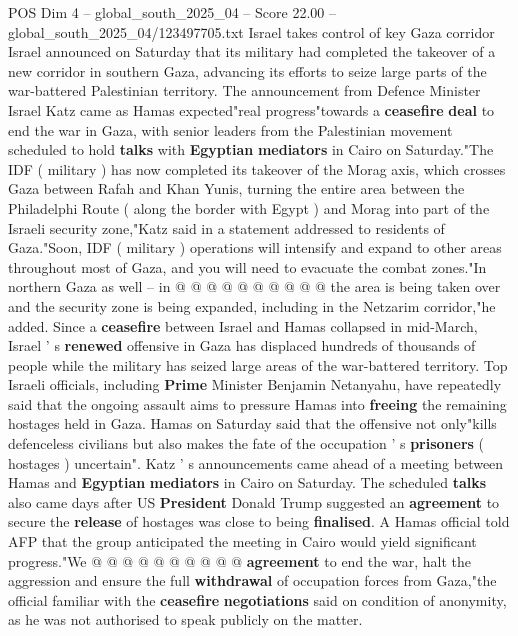 \begin{textsample}{POS Dim 4 – global\_south\_2025\_04 – Score 22.00 – global\_south\_2025\_04/123497705.txt}  \label{ex:f4_pos_223}
Israel takes control of key Gaza corridor Israel announced on Saturday that its military had completed the takeover of a new corridor in southern Gaza, advancing its efforts to seize large parts of the war-battered Palestinian territory.
The announcement from Defence Minister Israel Katz came as Hamas expected"real progress"towards a \textbf{ceasefire} \textbf{deal} to end the war in Gaza, with senior leaders from the Palestinian movement scheduled to hold \textbf{talks} with \textbf{Egyptian} \textbf{mediators} in Cairo on Saturday."The IDF ( military ) has now completed its takeover of the Morag axis, which crosses Gaza between Rafah and Khan Yunis, turning the entire area between the Philadelphi Route ( along the border with Egypt ) and Morag into part of the Israeli security zone,"Katz said in a statement addressed to residents of Gaza."Soon, IDF ( military ) operations will intensify and expand to other areas throughout most of Gaza, and you will need to evacuate the combat zones."In northern Gaza as well -- in @ @ @ @ @ @ @ @ @ @ the area is being taken over and the security zone is being expanded, including in the Netzarim corridor,"he added.
Since a \textbf{ceasefire} between Israel and Hamas collapsed in mid-March, Israel ' s \textbf{renewed} offensive in Gaza has displaced hundreds of thousands of people while the military has seized large areas of the war-battered territory.
Top Israeli officials, including \textbf{Prime} Minister Benjamin Netanyahu, have repeatedly said that the ongoing assault aims to pressure Hamas into \textbf{freeing} the remaining hostages held in Gaza.
Hamas on Saturday said that the offensive not only"kills defenceless civilians but also makes the fate of the occupation ' s \textbf{prisoners} ( hostages ) uncertain".
Katz ' s announcements came ahead of a meeting between Hamas and \textbf{Egyptian} \textbf{mediators} in Cairo on Saturday.
The scheduled \textbf{talks} also came days after US \textbf{President} Donald Trump suggested an \textbf{agreement} to secure the \textbf{release} of hostages was close to being \textbf{finalised}.
A Hamas official told AFP that the group anticipated the meeting in Cairo would yield significant progress."We @ @ @ @ @ @ @ @ @ @ \textbf{agreement} to end the war, halt the aggression and ensure the full \textbf{withdrawal} of occupation forces from Gaza,"the official familiar with the \textbf{ceasefire} \textbf{negotiations} said on condition of anonymity, as he was not authorised to speak publicly on the matter.

\end{textsample}
